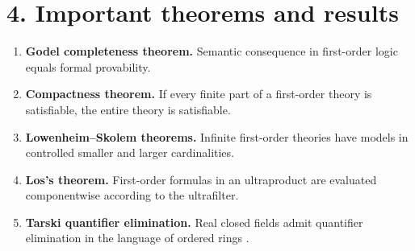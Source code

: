 \section*{4. Important theorems and results}
\begin{enumerate}[leftmargin=*,itemsep=0.35em]
\item \textbf{Godel completeness theorem.} Semantic consequence in first-order logic equals formal provability.

\item \textbf{Compactness theorem.} If every finite part of a first-order theory is satisfiable, the entire theory is satisfiable.

\item \textbf{Lowenheim--Skolem theorems.} Infinite first-order theories have models in controlled smaller and larger cardinalities.

\item \textbf{Los's theorem.} First-order formulas in an ultraproduct are evaluated componentwise according to the ultrafilter.

\item \textbf{Tarski quantifier elimination.} Real closed fields admit quantifier elimination in the language of ordered rings \cite{model_theory_ref1}.
\end{enumerate}

\theoryapplications
{}

